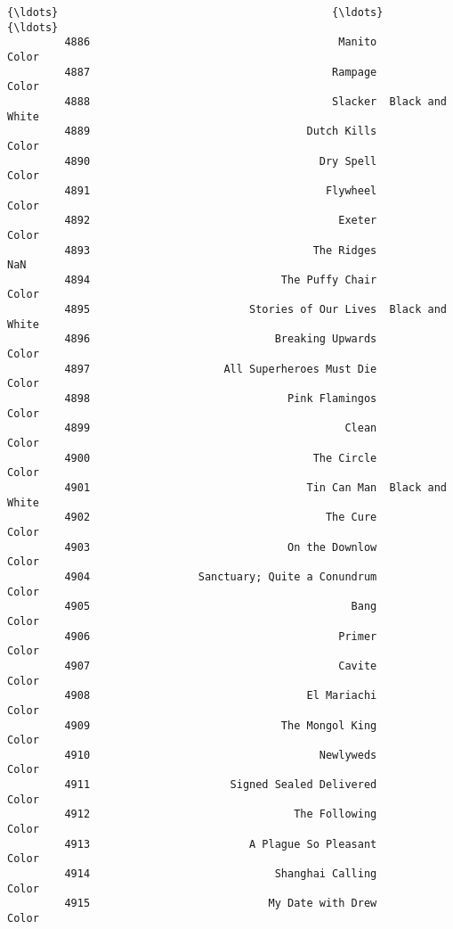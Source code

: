 \documentclass[11pt]{article}
\begin{document}
\begin{Verbatim}[commandchars=\\\{\}]
         {\ldots}                                           {\ldots}              {\ldots}   
         4886                                       Manito            Color   
         4887                                      Rampage            Color   
         4888                                      Slacker  Black and White   
         4889                                  Dutch Kills            Color   
         4890                                    Dry Spell            Color   
         4891                                     Flywheel            Color   
         4892                                       Exeter            Color   
         4893                                   The Ridges              NaN   
         4894                              The Puffy Chair            Color   
         4895                         Stories of Our Lives  Black and White   
         4896                             Breaking Upwards            Color   
         4897                     All Superheroes Must Die            Color   
         4898                               Pink Flamingos            Color   
         4899                                        Clean            Color   
         4900                                   The Circle            Color   
         4901                                  Tin Can Man  Black and White   
         4902                                     The Cure            Color   
         4903                               On the Downlow            Color   
         4904                 Sanctuary; Quite a Conundrum            Color   
         4905                                         Bang            Color   
         4906                                       Primer            Color   
         4907                                       Cavite            Color   
         4908                                  El Mariachi            Color   
         4909                              The Mongol King            Color   
         4910                                    Newlyweds            Color   
         4911                      Signed Sealed Delivered            Color   
         4912                                The Following            Color   
         4913                         A Plague So Pleasant            Color   
         4914                             Shanghai Calling            Color   
         4915                            My Date with Drew            Color   
         

\end{Verbatim}
\end{document}
